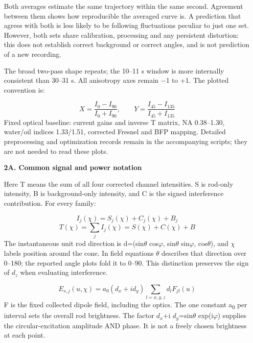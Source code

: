\documentclass[10pt,a4paper]{article}
\newcommand{\heading}[1]{{\sffamily\Large\bfseries\color{ink}#1}\par\vspace{7pt}}
\begin{document}
Both averages estimate the same trajectory within the same second. Agreement between them shows how reproducible the averaged curve is. A prediction that agrees with both is less likely to be following fluctuations peculiar to just one set. However, both sets share calibration, processing and any persistent distortion: this does not establish correct background or correct angles, and is not prediction of a new recording.\par
The broad two-pass shape repeats; the 10–11 s window is more internally consistent than 30–31 s. All anisotropy axes remain \(-\)1 to +1. The plotted convention is:\par
\begin{equation*}X=\frac{I_0-I_{90}}{I_0+I_{90}},\qquad Y=\frac{I_{45}-I_{135}}{I_{45}+I_{135}}\end{equation*}
Fixed optical baseline: current gains and inverse T matrix, NA 0.38–1.30, water/oil indices 1.33/1.51, corrected Fresnel and BFP mapping. Detailed preprocessing and optimization records remain in the accompanying scripts; they are not needed to read these plots.\par
\clearpage
\heading{2A. Common signal and power notation}
Here T means the sum of all four corrected channel intensities. S is rod-only intensity, B is background-only intensity, and C is the signed interference contribution. For every family:\par
\begin{equation*}I_j(\chi)=S_j(\chi)+C_j(\chi)+B_j\end{equation*}
\begin{equation*}T(\chi)=\sum_j I_j(\chi)=S(\chi)+C(\chi)+B\end{equation*}
The instantaneous unit rod direction is d=(sin\(θ\) cos\(φ\), sin\(θ\) sin\(φ\), cos\(θ\)), and \(χ\) labels position around the cone. In field equations \(θ\) describes that direction over 0–180\textdegree{}; the reported angle plots fold it to 0–90\textdegree{}. This distinction preserves the sign of \(d_{z}\) when evaluating interference.\par
\begin{equation*}E_{s,j}(u,\chi)=a_0(d_x+i d_y)\sum_{l=x,y,z}d_l F_{jl}(u)\end{equation*}
F is the fixed collected dipole field, including the optics. The one constant a\textsubscript{0} per interval sets the overall rod brightness. The factor \(d_{x}\)+i \(d_{y}\)=sin\(θ\) exp(i\(φ\)) supplies the circular-excitation amplitude AND phase. It is not a freely chosen brightness at each point.\par
\end{document}
